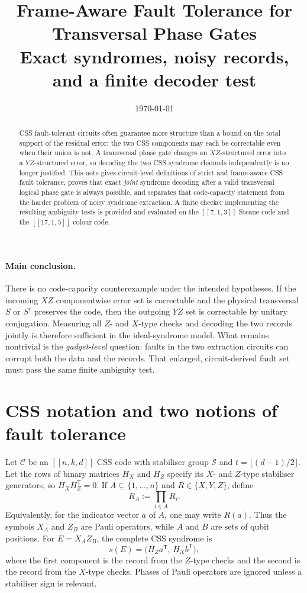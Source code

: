 \documentclass[11pt]{article}
\title{Frame-Aware Fault Tolerance for Transversal Phase Gates\\
\large Exact syndromes, noisy records, and a finite decoder test}
\author{}
\date{\today}
\theoremstyle{remark}
\newcommand{\cC}{\mathcal C}
\newcommand{\cS}{\mathcal S}
\begin{document}
\maketitle

\begin{abstract}
CSS fault-tolerant circuits often guarantee more structure than a bound on
the total support of the residual error: the two CSS components may each be
correctable even when their union is not.  A transversal phase gate changes
an $XZ$-structured error into a $YZ$-structured error, so decoding the two
CSS syndrome channels independently is no longer justified.  This note
gives circuit-level definitions of strict and frame-aware CSS fault
tolerance, proves that exact \emph{joint} syndrome decoding after a valid
transversal logical phase gate is always possible, and separates that
code-capacity statement from the harder problem of noisy syndrome
extraction.  A finite checker implementing the resulting ambiguity tests is
provided and evaluated on the $[[7,1,3]]$ Steane code and the $[[17,1,5]]$
colour code.
\end{abstract}

\paragraph{Main conclusion.}
There is no code-capacity counterexample under the intended hypotheses.  If
the incoming $XZ$ componentwise error set is correctable and the physical
transversal $S$ or $S^\dagger$ preserves the code, then the outgoing $YZ$
set is correctable by unitary conjugation.  Measuring all $Z$- and $X$-type
checks and decoding the two records jointly is therefore sufficient in the
ideal-syndrome model.  What remains nontrivial is the \emph{gadget-level}
question: faults in the two extraction circuits can corrupt both the data
and the records.  That enlarged, circuit-derived fault set must pass the
same finite ambiguity test.

\section{CSS notation and two notions of fault tolerance}

Let $\cC$ be an $[[n,k,d]]$ CSS code with stabiliser group $\cS$ and
$t=\lfloor(d-1)/2\rfloor$.  Let the rows of binary matrices $H_X$ and $H_Z$
specify its $X$- and $Z$-type stabiliser generators, so
$H_XH_Z^{\mathsf T}=0$.  If $A\subseteq\{1,\ldots,n\}$ and
$R\in\{X,Y,Z\}$, define
\[
 R_A:=\prod_{i\in A}R_i.
\]
Equivalently, for the indicator vector $a$ of $A$, one may write $R(a)$.
Thus the symbols $X_A$ and $Z_B$ are Pauli operators, while $A$ and $B$ are
sets of qubit positions.  For $E=X_AZ_B$, the complete CSS syndrome is
\[
 s(E)=\bigl(H_Za^{\mathsf T},\,H_Xb^{\mathsf T}\bigr),
 \tag{1}
\]
where the first component is the record from the $Z$-type checks and the
second is the record from the $X$-type checks.  Phases of Pauli operators
are ignored unless a stabiliser sign is relevant.
\end{document}
